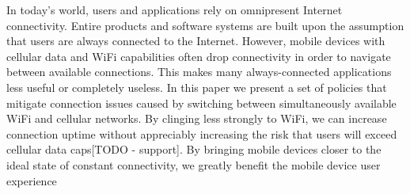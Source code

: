 
In today's world, users and applications rely on omnipresent Internet connectivity. Entire products and software systems are built upon the assumption that users are always connected to the Internet. However, mobile devices with cellular data and WiFi capabilities often drop connectivity in order to navigate between available connections. This makes many always-connected applications less useful or completely useless. In this paper we present a set of policies that mitigate connection issues caused by switching between simultaneously available WiFi and cellular networks. By clinging less strongly to WiFi, we can increase connection uptime without appreciably increasing the risk that users will exceed cellular data caps[TODO - support]. By bringing mobile devices closer to the ideal state of constant connectivity, we greatly benefit the mobile device user experience